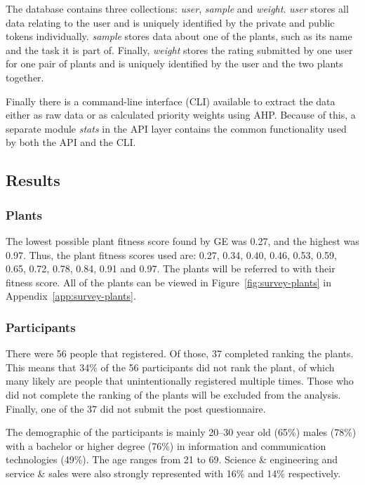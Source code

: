 The database contains three collections: \textit{user}, \textit{sample} and \textit{weight}.
\textit{user} stores all data relating to the user and is uniquely identified by the private and public tokens individually.
\textit{sample} stores data about one of the plants, such as its name and the task it is part of.
Finally, \textit{weight} stores the rating submitted by one user for one pair of plants and is uniquely identified by the user and the two plants together.

Finally there is a command-line interface (CLI) available to extract the data either as raw data or as calculated priority weights using AHP.
Because of this, a separate module \textit{stats} in the API layer contains the common functionality used by both the API and the CLI.

\subsection{Results}
\subsubsection{Plants}
The lowest possible plant fitness score found by GE was 0.27, and the highest was 0.97.
Thus, the plant fitness scores used are: 0.27, 0.34, 0.40, 0.46, 0.53, 0.59, 0.65, 0.72, 0.78, 0.84, 0.91 and 0.97.
The plants will be referred to with their fitness score.
All of the plants can be viewed in Figure~\ref{fig:survey-plants} in Appendix~\ref{app:survey-plants}.

\subsubsection{Participants}

There were 56 people that registered.
Of those, 37 completed ranking the plants.
This means that 34\% of the 56 participants did not rank the plant, of which many likely are people that unintentionally registered multiple times.
Those who did not complete the ranking of the plants will be excluded from the analysis.
Finally, one of the 37 did not submit the post questionnaire.

The demographic of the participants is mainly 20--30 year old (65\%) males (78\%) with a bachelor or higher degree (76\%) in information and communication technologies (49\%).
The age ranges from 21 to 69.
Science \& engineering and service \& sales were also strongly represented with 16\% and 14\% respectively.

